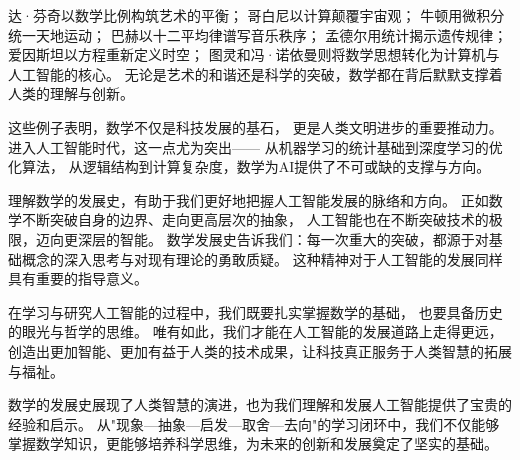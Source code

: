 达·芬奇以数学比例构筑艺术的平衡；  
哥白尼以计算颠覆宇宙观；  
牛顿用微积分统一天地运动；  
巴赫以十二平均律谱写音乐秩序；  
孟德尔用统计揭示遗传规律；  
爱因斯坦以方程重新定义时空；  
图灵和冯·诺依曼则将数学思想转化为计算机与人工智能的核心。  
无论是艺术的和谐还是科学的突破，数学都在背后默默支撑着人类的理解与创新。

这些例子表明，数学不仅是科技发展的基石，  
更是人类文明进步的重要推动力。  
进入人工智能时代，这一点尤为突出——  
从机器学习的统计基础到深度学习的优化算法，  
从逻辑结构到计算复杂度，数学为AI提供了不可或缺的支撑与方向。

理解数学的发展史，有助于我们更好地把握人工智能发展的脉络和方向。  
正如数学不断突破自身的边界、走向更高层次的抽象，  
人工智能也在不断突破技术的极限，迈向更深层的智能。  
数学发展史告诉我们：每一次重大的突破，都源于对基础概念的深入思考与对现有理论的勇敢质疑。  
这种精神对于人工智能的发展同样具有重要的指导意义。

在学习与研究人工智能的过程中，我们既要扎实掌握数学的基础，  
也要具备历史的眼光与哲学的思维。  
唯有如此，我们才能在人工智能的发展道路上走得更远，
创造出更加智能、更加有益于人类的技术成果，让科技真正服务于人类智慧的拓展与福祉。

数学的发展史展现了人类智慧的演进，也为我们理解和发展人工智能提供了宝贵的经验和启示。  
从"现象—抽象—启发—取舍—去向"的学习闭环中，我们不仅能够掌握数学知识，更能够培养科学思维，为未来的创新和发展奠定了坚实的基础。